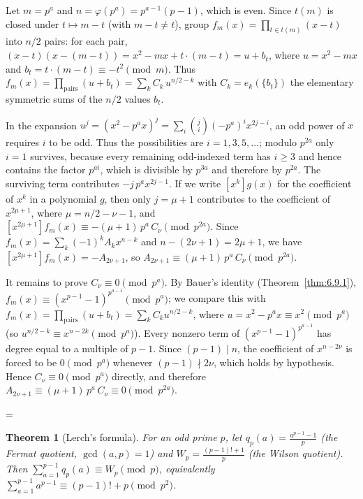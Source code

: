 \documentclass[11pt]{article}
\makeatletter
\theoremstyle{ntstyle}
\newtheorem{theorem}{Theorem}[subsection]
\let\nt@closedisplay\]
\def\nt@guardedclose{\@ifnextchar\par{\nt@closeafterpar}{\@ifnextchar\end{\postdisplaypenalty\@M\nt@closedisplay}{\nt@closedisplay}}}
\def\nt@closeafterpar\par{\@ifnextchar\par{\nt@closeafterpar}{\@ifnextchar\end{\postdisplaypenalty\@M\nt@closedisplay\par}{\nt@closedisplay\par}}}
\renewenvironment{proof}[1][\proofname]{\par
  \pushQED{\qed}\normalfont\topsep\medskipamount\edef\nt@afterproof{\@endparpenalty=\the\@endparpenalty\relax}\@beginparpenalty\@M\@endparpenalty\@M\let\]\nt@guardedclose\trivlist\item[]\textit{#1\@addpunct{.}} \ignorespaces}{\ifvmode\addpenalty\@M\fi\popQED\nt@afterproof\endtrivlist\@endpefalse}
\makeatother
\begin{document}
\begin{proof} Let $m = p^{a}$ and $n = \varphi(p^{a}) =
		p^{a-1}(p-1)$, which is even. Since $t(m)$ is closed under $t \mapsto
		m - t$ (with $m - t \neq t$), group $f_m(x) = \prod_{t \in
			t(m)}(x-t)$ into $n/2$ pairs: for each pair, $(x-t)(x-(m-t)) = x^{2}
		- m x + t\cdot(m-t) = u + b_t$, where $u = x^{2} - m x$ and $b_t = t\cdot(m-t)
		\equiv -t^{2} \pmod{m}$. Thus $f_m(x) = \prod_{\text{pairs}}(u + b_t)
		= \sum_{k} C_k\, u^{n/2 - k}$ with $C_k = e_k(\{b_t\})$ the
	elementary symmetric sums of the $n/2$ values $b_t$.

	In the expansion $u^{j} = (x^{2} - p^{a} x)^{j} = \sum_{i}
		\binom{j}{i}(-p^{a})^{i} x^{2j - i}$, an odd power of $x$ requires $i$ to be odd. Thus the possibilities are $i=1,3,5,\ldots$; modulo $p^{2a}$ only $i=1$ survives, because every remaining odd-indexed term has $i\ge3$ and hence contains the factor $p^{ai}$, which is divisible by $p^{3a}$ and therefore by $p^{2a}$. The surviving term contributes $-j\,p^{a} x^{2j-1}$. If we write
	$[x^{k}] g(x)$ for the coefficient of $x^{k}$ in a polynomial $g$, then only
	$j = \mu+1$ contributes to the coefficient of $x^{2\mu+1}$, where $\mu = n/2 - \nu - 1$, and $[x^{2\mu+1}] f_m(x) \equiv -(\mu+1)\,p^{a}\, C_{\nu}
		\pmod{p^{2a}}$. Since $f_m(x) = \sum_k (-1)^{k} A_k x^{n-k}$ and $n -
		(2\nu+1) = 2\mu+1$, we have $[x^{2\mu+1}] f_m(x) = -A_{2\nu+1}$, so
	$A_{2\nu+1} \equiv (\mu+1)\,p^{a}\, C_{\nu} \pmod{p^{2a}}$.

	It remains to prove $C_{\nu} \equiv 0 \pmod{p^{a}}$. By Bauer's identity
	(Theorem~\ref{thm:6.9.1}), $f_m(x) \equiv (x^{p-1}-1)^{p^{a-1}} \pmod{p^{a}}$;
	we compare this with $f_m(x) = \prod_{\text{pairs}}(u+b_t) = \sum_k C_k
		u^{n/2-k}$, where $u = x^2 - p^a x \equiv x^2 \pmod{p^a}$ (so
	$u^{n/2-k} \equiv x^{n-2k} \pmod{p^a}$). Every nonzero term of
	$(x^{p-1}-1)^{p^{a-1}}$ has degree equal to a multiple of $p-1$. Since
	$(p-1)\mid n$, the coefficient of $x^{n-2\nu}$ is forced to be $0
		\pmod{p^a}$ whenever $(p-1) \nmid 2\nu$, which holds by hypothesis.
	Hence $C_{\nu} \equiv 0 \pmod{p^{a}}$ directly, and therefore
	$A_{2\nu+1} \equiv (\mu+1)\,p^{a}\,C_{\nu} \equiv 0 \pmod{p^{2a}}$.

\end{proof}
\begin{theorem}[Lerch's formula]\label{thm:6.9.3} For an odd prime
	$p$, let $q_p(a) = \tfrac{a^{p-1}-1}{p}$ (the Fermat quotient,
	$\gcd(a, p)=1$) and $W_p = \tfrac{(p-1)!+1}{p}$ (the Wilson quotient).
	Then $\sum_{a=1}^{p-1} q_p(a) \equiv W_p \pmod{p}$, equivalently
	$\sum_{a=1}^{p-1} a^{p-1} \equiv (p-1)! + p \pmod{p^{2}}$.

\end{theorem}
\end{document}
